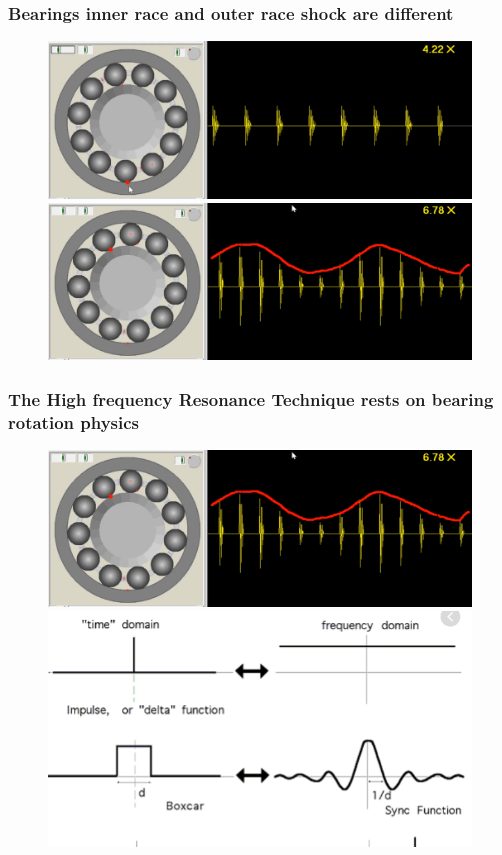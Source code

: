 \documentclass{beamer}
\begin{document}
\begin{frame}
	\frametitle{Bearings inner race and outer race shock are different}
	\begin{figure}[H]
		\centering
		\includegraphics[width=0.8\linewidth]{outer-race2}
		\includegraphics[width=0.8\linewidth]{inner-race2}
	\end{figure}
\end{frame}




\begin{frame}
	\frametitle{The High frequency Resonance Technique rests on bearing rotation physics }
	\begin{figure}[H]
		\centering
		\includegraphics[width=0.7\linewidth]{inner-race2}
		\includegraphics[width=0.7\linewidth]{inpulse}
	\end{figure}
\end{frame}
\end{document}
